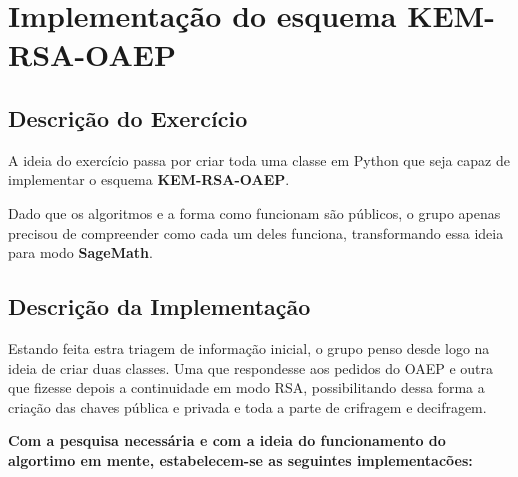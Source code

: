 \documentclass[12pt]{report}
\begin{document}
   
    \newpage
	  \hypersetup{linkcolor=black}
\vfill

	\tableofcontents
\vfill

	\newpage


\section{Implementação do esquema
KEM-RSA-OAEP}\label{implementauxe7uxe3o-do-esquema-kem-rsa-oaep}
\vspace{10 mm}
\subsection{Descrição do
Exercício}\label{descriuxe7uxe3o-do-exercuxedcio}

A ideia do exercício passa por criar toda uma classe em Python que seja
capaz de implementar o esquema \textbf{KEM-RSA-OAEP}.

Dado que os algoritmos e a forma como funcionam são públicos, o grupo
apenas precisou de compreender como cada um deles funciona,
transformando essa ideia para modo \textbf{SageMath}.
\vspace{5 mm}
\subsection{Descrição da
Implementação}\label{descriuxe7uxe3o-da-implementauxe7uxe3o}

Estando feita estra triagem de informação inicial, o grupo penso desde
logo na ideia de criar duas classes. Uma que respondesse aos pedidos do
OAEP e outra que fizesse depois a continuidade em modo RSA,
possibilitando dessa forma a criação das chaves pública e privada e toda
a parte de crifragem e decifragem.
\vspace{5 mm}

\textbf{Com a pesquisa necessária e com a ideia do funcionamento do
algortimo em mente, estabelecem-se as seguintes implementacões:}
\vspace{5 mm}
\end{document}
